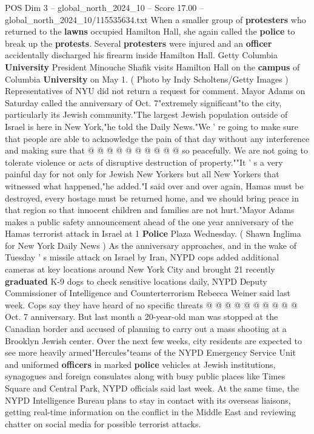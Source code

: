 \begin{textsample}{POS Dim 3 – global\_north\_2024\_10 – Score 17.00 – global\_north\_2024\_10/115535634.txt}
When a smaller group of \textbf{protesters} who returned to the \textbf{lawns} occupied Hamilton Hall, she again called the \textbf{police} to break up the \textbf{protests}.
Several \textbf{protesters} were injured and an \textbf{officer} accidentally discharged his firearm inside Hamilton Hall.
Getty Columbia \textbf{University} President Minouche Shafik visits Hamilton Hall on the \textbf{campus} of Columbia \textbf{University} on May 1. ( Photo by Indy Scholtens/Getty Images ) Representatives of NYU did not return a request for comment.
Mayor Adams on Saturday called the anniversary of Oct. 7"extremely significant"to the city, particularly its Jewish community."The largest Jewish population outside of Israel is here in New York,"he told the Daily News."We ' re going to make sure that people are able to acknowledge the pain of that day without any interference and making sure that @ @ @ @ @ @ @ @ @ @ so peacefully.
We are not going to tolerate violence or acts of disruptive destruction of property.""It ' s a very painful day for not only for Jewish New Yorkers but all New Yorkers that witnessed what happened,"he added."I said over and over again, Hamas must be destroyed, every hostage must be returned home, and we should bring peace in that region so that innocent children and families are not hurt."Mayor Adams makes a public safety announcement ahead of the one year anniversary of the Hamas terrorist attack in Israel at 1 \textbf{Police} Plaza Wednesday. ( Shawn Inglima for New York Daily News ) As the anniversary approaches, and in the wake of Tuesday ' s missile attack on Israel by Iran, NYPD cops added additional cameras at key locations around New York City and brought 21 recently \textbf{graduated} K-9 dogs to check sensitive locations daily, NYPD Deputy Commissioner of Intelligence and Counterterrorism Rebecca Weiner said last week.
Cops say they have heard of no specific threats @ @ @ @ @ @ @ @ @ @ Oct. 7 anniversary.
But last month a 20-year-old man was stopped at the Canadian border and accused of planning to carry out a mass shooting at a Brooklyn Jewish center.
Over the next few weeks, city residents are expected to see more heavily armed"Hercules"teams of the NYPD Emergency Service Unit and uniformed \textbf{officers} in marked \textbf{police} vehicles at Jewish institutions, synagogues and foreign consulates along with busy public places like Times Square and Central Park, NYPD officials said last week.
At the same time, the NYPD Intelligence Bureau plans to stay in contact with its overseas liaisons, getting real-time information on the conflict in the Middle East and reviewing chatter on social media for possible terrorist attacks.

\end{textsample}
